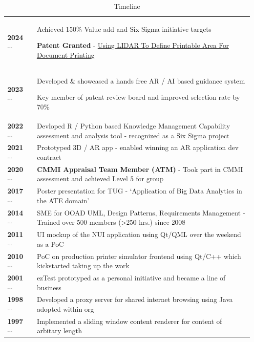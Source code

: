 \documentclass[a4paper,11pt]{article}
\newcommand\cvte[2]{\footnotesize{\textbf{#1}} ~$\cdots$~ & \footnotesize{#2}}
\begin{document}
\begin{table}
  \caption*{Timeline}
  \begin{tabular}{l|p{4cm}}
    \hline
	  \cvte{2024}{Achieved 150\% Value add and Six Sigma initiative targets} \par \textbf{Patent Granted} - \href{https://patents.justia.com/patent/12086483}{Using LIDAR To Define Printable Area For Document Printing} \\
    \cvte{2023}{Developed \& showcased a hands free AR / AI based guidance system \par Key member of patent review board and improved selection rate by 70\% } \\
    \cvte{2022}{Devloped R / Python based  Knowledge Management Capability assessment and analysis tool - recognized as a Six Sigma project} \\
    \cvte{2021}{Prototyped 3D / AR app - enabled winning an AR application dev contract} \\
    \cvte{2020}{\textbf{CMMI Appraisal Team Member (ATM)} - Took part in CMMI assessment and achieved Level 5 for group} \\
    \cvte{2017}{Poster presentation for TUG - `Application of Big Data Analytics in the ATE domain'} \\
    \cvte{2014}{SME for OOAD UML, Design Patterns, Requirements Management - Trained over 500 members (>250 hrs.) since 2008} \\
    \cvte{2011}{UI mockup of the NUI application using Qt/QML over the weekend as a PoC} \\
    \cvte{2010}{PoC on production printer simulator frontend using Qt/C++ which kickstarted taking up the work} \\
    \cvte{2001}{ezTest prototyped as a personal initiative and became a line of business} \\
    \cvte{1998}{Developed a proxy server for shared internet browsing using Java adopted within org} \\
    \cvte{1997}{Implemented a sliding window content renderer for content of arbitary length} \\
    \hline
  \end{tabular}
\end{table}
\end{document}
